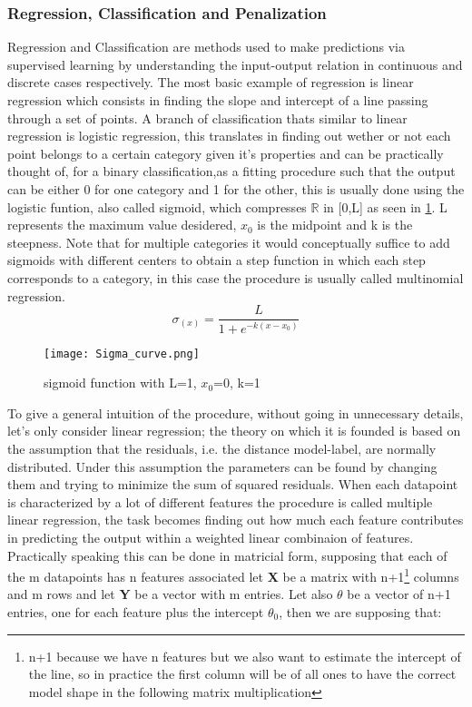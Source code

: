 \subsubsection{Regression, Classification and Penalization}
Regression and Classification are methods used to make predictions via supervised learning by understanding the input-output relation in continuous and discrete cases respectively. The most basic example of regression is linear regression which consists in finding the slope and intercept of a line passing through a set of points. A branch of classification thats similar to linear regression is logistic regression, this translates in finding out wether or not each point belongs to a certain category given it's properties and can be practically thought of, for a binary classification,as a fitting procedure such that the output can be either 0 for one category and 1 for the other, this is usually done using the logistic funtion, also called sigmoid, which compresses $\mathbb {R}$ in [0,L] as seen in  \ref{sigmoid}. L represents the maximum value desidered, $x_0$ is the midpoint and k is the steepness. Note that for multiple categories it would conceptually suffice to add sigmoids with different centers to obtain a step function in which each step corresponds to a category, in this case the procedure is usually called multinomial regression. 
\begin{equation}
\sigma_{(x)} = \frac{L}{1+e^{-k(x-x_0)}}
\end{equation}

\begin{figure}[H]
		\centering
  		\texttt{[image: Sigma\_curve.png]}
        \caption{sigmoid function with L=1, $x_0$=0, k=1 \label{sigmoid}}
\end{figure}

To give a general intuition of the procedure, without going in unnecessary details, let's only consider linear regression; the theory on which it is founded is based on the assumption that the residuals, i.e. the distance model-label, are normally distributed. Under this assumption the parameters can be found by changing them and trying to minimize the sum of squared residuals.
When each datapoint is characterized by a lot of different features the procedure is called multiple linear regression, the task becomes finding out how much each feature contributes in predicting the output within a weighted linear combinaion of features. Practically speaking this can be done in matricial form, supposing that each of the m datapoints has n features associated let  \textbf{X} be a matrix with n+1\footnote{n+1 because we have n features but we also want to estimate the intercept of the line, so in practice the first column will be of all ones to have the correct model shape in the following matrix multiplication} columns and m rows and let  \textbf{Y} be a vector with m entries. Let also  \textbf{$\theta$} be a vector of n+1 entries, one for each feature plus the intercept $\theta_0$, then we are supposing that:

